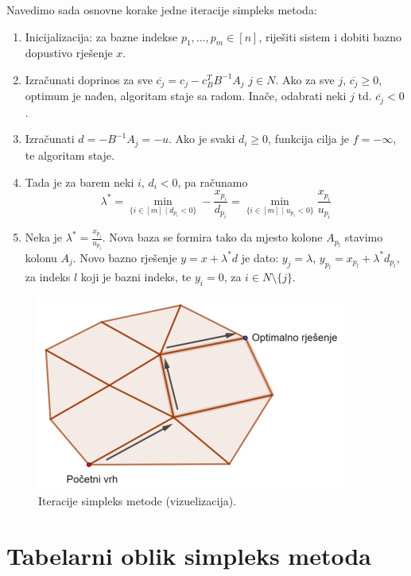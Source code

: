 \documentclass[a4paper, utf8, 11pt, colorlinks]{book}
\begin{document}
Navedimo sada osnovne korake jedne iteracije simpleks metoda:
\begin{enumerate}
    \item Inicijalizacija: za bazne indekse $p_1,\ldots,p_m \in [n]$, riješiti sistem i dobiti bazno dopustivo rješenje $x$. 
    \item Izračunati doprinos za sve $\overline{c_j} = c_j - c_B^T B^{-1}A_j $
          $j \in N$. Ako za sve $j$, $\overline{c_j} \geq 0$, optimum je nađen, algoritam staje sa radom. Inače, odabrati neki $j$  td. $\overline{c_j}<0$.
    \item Izračunati $d = -B^{-1}A_j = -u$. Ako je svaki $d_i \geq  0$, funkcija cilja je $f = - \infty$, te algoritam staje. 
    \item Tada je za barem neki $i$, $d_i < 0$, pa računamo 
             $$ \lambda^* = \min_{ \{i\in [m] \mid d_{p_i} < 0  \}} - \frac{x_{p_i}}{d_{p_i}} =  \min_{ \{i\in [m] \mid u_{p_i} < 0  \}} \frac{x_{p_i}}{u_{p_i}} $$
    \item Neka je $\lambda^* = \frac{x_{p_l}}{u_{p_l}}$. Nova baza se formira tako da mjesto kolone $A_{p_l}$ stavimo kolonu $A_j$. Novo bazno rješenje 
    $y = x + \lambda^*d $ je dato: $y_j = \lambda$, $y_{p_l} = x_{p_l} + \lambda^* d_{p_l}$, za indeks $l$ koji je bazni indeks, te $y_i = 0$, za $i \in N \setminus \{j\}$. 
\end{enumerate}

\begin{figure}[!ht]
	\centering
   \includegraphics[scale=1.5]{simpleks_move.eps}\vspace{-2cm}
    \caption{Iteracije simpleks metode (vizuelizacija).}
    \label{fig:simpleks-visuelisation}
\end{figure}

\section{Tabelarni oblik simpleks metoda}
\end{document}

